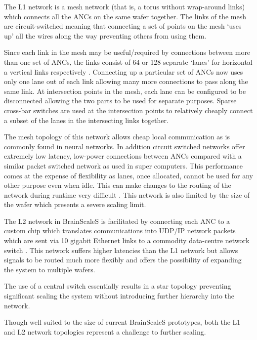 				The L1 network is a mesh network (that is, a torus without wrap-around
				links) which connects all the ANCs on the same wafer together.  The
				links of the mesh are circuit-switched meaning that connecting a set of
				points on the mesh `uses up' all the wires along the way preventing
				others from using them.
				
				Since each link in the mesh may be useful/required by connections
				between more than one set of ANCs, the links consist of 64 or 128
				separate `lanes' for horizontal a vertical links respectively
				\cite{fieres08}. Connecting up a particular set of ANCs now uses only
				one lane out of each link allowing many more connections to pass along
				the same link. At intersection points in the mesh, each lane can be
				configured to be disconnected allowing the two parts to be used for
				separate purposes. Sparse cross-bar switches are used at the
				intersection points to relatively cheaply connect a subset of the lanes
				in the intersecting links together.
				
				The mesh topology of this network allows cheap local communication as is
				commonly found in neural networks.  In addition circuit switched
				networks offer extremely low latency, low-power connections between ANCs
				compared with a similar packet switched network as used in super
				computers. This performance comes at the expense of flexibility as
				lanes, once allocated, cannot be used for any other purpose even when
				idle. This can make changes to the routing of the network during runtime
				very difficult \cite{dally04}. This network is also limited by the size
				of the wafer which presents a severe scaling limit.
				
				The L2 network in BrainScaleS is facilitated by connecting each ANC to a
				custom chip which translates communications into UDP/IP network packets
				which are sent via 10 gigabit Ethernet links to a commodity data-centre
				network switch \cite{schemmel10}. This network suffers higher latencies
				than the L1 network but allows signals to be routed much more flexibly
				and offers the possibility of expanding the system to multiple wafers.
				
				The use of a central switch essentially results in a star topology
				preventing significant scaling the system without introducing further
				hierarchy into the network.
				
				Though well suited to the size of current BrainScaleS prototypes, both
				the L1 and L2 network topologies represent a challenge to further
				scaling.
	
